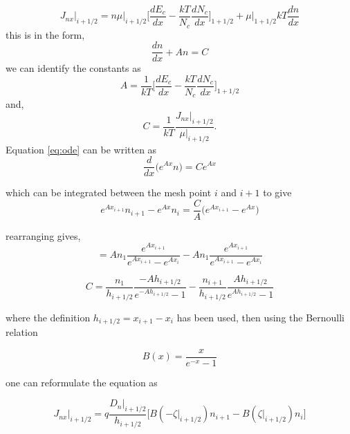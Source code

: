 \documentclass[11pt]{article}
\begin{document}
\begin{equation}
J_{nx} \rvert_{i+1/2}=n \mu \rvert_{i+1/2} \bigg[ \frac{dE_c}{dx}-\frac{kT}{N_c}\frac{dN_{c}}{dx} \bigg]_{1+1/2}+\mu \rvert_{1+1/2} kT \frac{dn}{dx}
\end{equation}
this is in the form,
\begin{equation}
\frac{dn}{dx}+An=C
\label{eq:ode}
\end{equation}
we can identify the constants as
\begin{equation}
A=\frac{1}{kT}\bigg[ \frac{dE_c}{dx}-\frac{kT}{N_c}\frac{dN_{c}}{dx} \bigg]_{1+1/2}
\end{equation}
and,
\begin{equation}
C=\frac{1}{kT}\frac{J_{nx} \rvert_{i+1/2}}{\mu \rvert_{i+1/2}} .
\end{equation}
Equation \ref{eq:ode} can be written as
\begin{equation}
\frac{d}{dx} \bigg( e^{Ax} n \bigg)=Ce^{Ax}
\end{equation}

which can be integrated between the mesh point $i$ and $i+1$ to give
\begin{equation}
e^{Ax_{i+1}}n_{i+1}-e^{Ax}n_{i}=\frac{C}{A} \bigg( e^{Ax_{i+1}}-e^{Ax} \bigg)
\end{equation}

rearranging gives,
\begin{equation}
=An_{1}\frac{e^{Ax_{i+1}}}{e^{Ax_{i+1}}-e^{Ax_{i}}}-An_{1}\frac{e^{Ax_{i+1}}}{e^{Ax_{i+1}}-e^{Ax_{i}}}
\end{equation}

\begin{equation}
C=\frac{n_{1}}{h_{i+1/2}}\frac{-A h_{i+1/2}}{e^{-Ah_{i+1/2}}-1}-\frac{n_{i+1}}{h_{i+1/2}}\frac{Ah_{i+1/2}}{e^{Ah_{i+1/2}}-1}
\end{equation}

where the definition $h_{i+1/2}=x_{i+1}-x_{i}$ has been used, then using the Bernoulli relation

\begin{equation}
B(x)=\frac{x}{e^{-x}-1}
\end{equation}

one can reformulate the equation as

\begin{equation}
J_{nx} \rvert_{i+1/2} = q \frac{D_{n}\rvert_{i+1/2}}{h_{i+1/2}} \bigg[ B(-\zeta \rvert_{i+1/2}) n_{i+1}- B(\zeta \rvert_{i+1/2}) n_{i} \bigg]
\end{equation}
\end{document}
